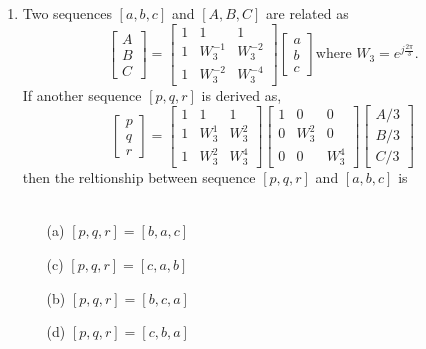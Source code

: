 \documentclass[12pt,-letter paper]{article}
\providecommand{\sbrak}[1]{\ensuremath{{}\left[#1\right]}}
\theoremstyle{remark}
\begin{document}
\begin{enumerate}
 \item Two sequences $\sbrak{a,b,c}$ and $\sbrak{A,B,C}$ are related as\\
 \[\begin{bmatrix}
    A\\
    B\\
    C
 \end{bmatrix}=
 \begin{bmatrix}
     1 & 1 & 1\\
     1 & W_3^{-1} & W_3^{-2}\\
     1 & W_3^{-2} & W_3^{-4}
 \end{bmatrix}
 \begin{bmatrix}
     a\\
     b\\
     c
 \end{bmatrix} \text{where } W_3=e^{j\frac{2\pi}{3}}.\]
 If another sequence $\sbrak{p,q,r}$ is derived as,
 \[\begin{bmatrix}
     p\\q\\r
 \end{bmatrix} = 
 \begin{bmatrix}
     1 & 1 & 1\\
     1 & W_3^{1} & W_3^{2}\\
     1 & W_3^{2} & W_3^{4}
 \end{bmatrix}
 \begin{bmatrix}
     1 & 0 & 0 \\ 0 & W_3^2 & 0 \\ 0 & 0 & W_3^4
 \end{bmatrix}
 \begin{bmatrix}
     A/3\\ B/3\\ C/3
 \end{bmatrix}
 \] then the reltionship between sequence $\sbrak{p,q,r}$ and $\sbrak{a,b,c}$ is  \\ \\
 \begin{minipage}[t]{.5\textwidth}
    \begin{itemize}
        \item[(a)] $\sbrak{p,q,r}=\sbrak{b,a,c}$
        \item[(c)] $\sbrak{p,q,r}=\sbrak{c,a,b}$
    \end{itemize}
    \end{minipage}
    \hfill %
    \begin{minipage}[t]{.5\textwidth}
    \begin{itemize}
        \item[(b)] $\sbrak{p,q,r}=\sbrak{b,c,a}$
        \item[(d)] $\sbrak{p,q,r}=\sbrak{c,b,a}$
    \end{itemize}
    \end{minipage}
 

\end{enumerate}
\end{document}
